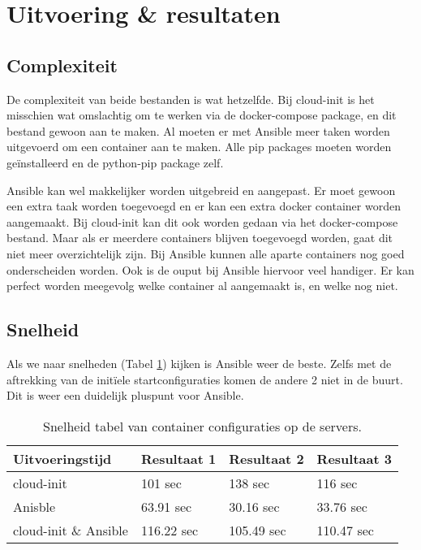 \section{Uitvoering \& resultaten}
\subsection{Complexiteit}
De complexiteit van beide bestanden is wat hetzelfde. Bij cloud-init is het misschien wat omslachtig om te werken via de docker-compose package, en dit bestand gewoon aan te maken. Al moeten er met Ansible meer taken worden uitgevoerd om een container aan te maken. Alle pip packages moeten worden geïnstalleerd en de python-pip package zelf. 

Ansible kan wel makkelijker worden uitgebreid en aangepast. Er moet gewoon een extra taak worden toegevoegd en er kan een extra docker container worden aangemaakt. Bij cloud-init kan dit ook worden gedaan via het docker-compose bestand. Maar als er meerdere containers blijven toegevoegd worden, gaat dit niet meer overzichtelijk zijn. Bij Ansible kunnen alle aparte containers nog goed onderscheiden worden. Ook is de ouput bij Ansible hiervoor veel handiger. Er kan perfect worden meegevolg welke container al aangemaakt is, en welke nog niet.

\subsection{Snelheid}
Als we naar snelheden (Tabel \ref{tab:tabel resultaten container}) kijken is Ansible  weer de beste. Zelfs met de aftrekking van de initïele startconfiguraties komen de andere 2 niet in de buurt. Dit is weer een duidelijk pluspunt voor Ansible.
\begin{table}[!htb]
	\centering
	\begin{tabular}{| l | l | l |l |}
        \hline
        \textbf{Uitvoeringstijd} & Resultaat 1 & Resultaat 2 & Resultaat 3   \\ \hline
        cloud-init & 101 sec & 138 sec & 116 sec  \\ \hline
        Anisble & 63.91 sec & 30.16 sec & 33.76 sec \\ \hline
        cloud-init \& Ansible & 116.22 sec & 105.49 sec & 110.47 sec \\
        \hline
    \end{tabular}
	\caption{Snelheid tabel van container configuraties op de servers.}
	\label{tab:tabel resultaten container}
\end{table}

